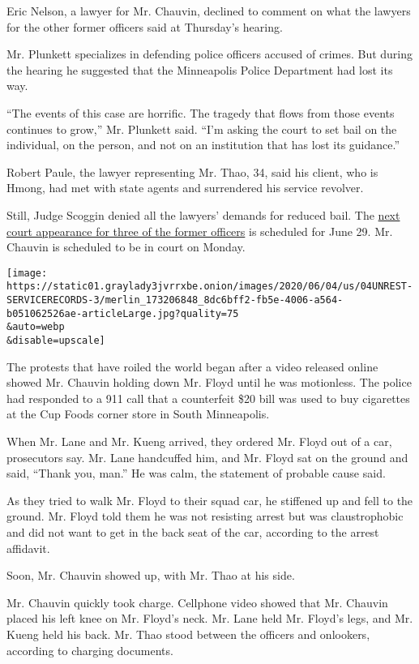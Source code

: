 Eric Nelson, a lawyer for Mr. Chauvin, declined to comment on what the
lawyers for the other former officers said at Thursday's hearing.

Mr. Plunkett specializes in defending police officers accused of crimes.
But during the hearing he suggested that the Minneapolis Police
Department had lost its way.

``The events of this case are horrific. The tragedy that flows from
those events continues to grow,'' Mr. Plunkett said. ``I'm asking the
court to set bail on the individual, on the person, and not on an
institution that has lost its guidance.''

Robert Paule, the lawyer representing Mr. Thao, 34, said his client, who
is Hmong, had met with state agents and surrendered his service
revolver.

Still, Judge Scoggin denied all the lawyers' demands for reduced bail.
The
\href{https://www.nytimes3xbfgragh.onion/2020/06/29/us/derek-chauvin-court-hearing.html}{next
court appearance for three of the former officers} is scheduled for June
29. Mr. Chauvin is scheduled to be in court on Monday.

\texttt{[image: https://static01.graylady3jvrrxbe.onion/images/2020/06/04/us/04UNREST-SERVICERECORDS-3/merlin\_173206848\_8dc6bff2-fb5e-4006-a564-b051062526ae-articleLarge.jpg?quality=75\\\&auto=webp\\\&disable=upscale]}

The protests that have roiled the world began after a video released
online showed Mr. Chauvin holding down Mr. Floyd until he was
motionless. The police had responded to a 911 call that a counterfeit
\$20 bill was used to buy cigarettes at the Cup Foods corner store in
South Minneapolis.

When Mr. Lane and Mr. Kueng arrived, they ordered Mr. Floyd out of a
car, prosecutors say. Mr. Lane handcuffed him, and Mr. Floyd sat on the
ground and said, ``Thank you, man.'' He was calm, the statement of
probable cause said.

As they tried to walk Mr. Floyd to their squad car, he stiffened up and
fell to the ground. Mr. Floyd told them he was not resisting arrest but
was claustrophobic and did not want to get in the back seat of the car,
according to the arrest affidavit.

Soon, Mr. Chauvin showed up, with Mr. Thao at his side.

Mr. Chauvin quickly took charge. Cellphone video showed that Mr. Chauvin
placed his left knee on Mr. Floyd's neck. Mr. Lane held Mr. Floyd's
legs, and Mr. Kueng held his back. Mr. Thao stood between the officers
and onlookers, according to charging documents.

